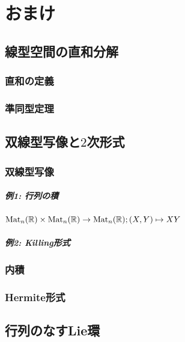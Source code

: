 \chapter{おまけ}

\section{線型空間の直和分解}

\subsection{直和の定義}

\subsection{準同型定理}

\section{双線型写像と$2$次形式}

\subsection{双線型写像}

\paragraph{例1: 行列の積}

$\operatorname{Mat}_n(\mathbb{R}) \times \operatorname{Mat}_n(\mathbb{R}) \rightarrow \operatorname{Mat}_n(\mathbb{R}); (X, Y) \mapsto XY$

\paragraph{例2: Killing形式}

\subsection{内積}

\subsection{Hermite形式}

\section{行列のなすLie環}

